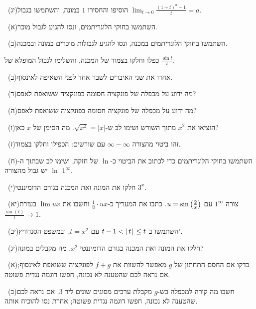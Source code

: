 \documentclass[12pt, a4paper]{article}
\begin{document}
\noindent {}\ (יג)\enskip הוסיפו והחסירו $1$ במונה, והשתמשו בגבול $\lim_{t\to0}\frac{(1+t)^a-1}{t}=a$.\par\smallskip
\noindent {}\ (א)\enskip השתמשו בחוקי הלוגריתמים, ונסו להגיע לגבול מוכר.\par\smallskip
\noindent {}\ (ב)\enskip השתמשו בחוקי הלוגריתמים במכנה, ונסו להגיע לגבולות מוכרים במונה ובמכנה.\par\smallskip
\noindent {}\enskip כפלו וחלקו בצמוד של המכנה, והשלימו לגבול המופלא של $\frac{\sin t}{t}$.\par\smallskip
\noindent {}\ (ב)\enskip אחדו את שני האיברים לשבר אחד לפני השאיפה לאינסוף.\par\smallskip
\noindent {}\ (ד)\enskip מה ידוע על מכפלה של פונקציה חסומה בפונקציה ששואפת לאפס?\par\smallskip
\noindent {}\ (ה)\enskip מה ידוע על מכפלה של פונקציה חסומה בפונקציה ששואפת לאפס?\par\smallskip
\noindent {}\ (ו)\enskip הוציאו את $x^2$ מתוך השורש ושימו לב ש-$\sqrt{x^2}=|x|$. מה הסימן של $x$ כאן?\par\smallskip
\noindent {}\ (ז)\enskip זהו ביטוי מהצורה $\infty-\infty$ עם שורשים: הכפילו וחלקו בצמוד.\par\smallskip
\noindent {}\ (ח)\enskip השתמשו בחוקי הלוגריתמים כדי לכתוב את הביטוי כ-$\ln$ של חזקה, ושימו לב שבתוך ה-$\ln$ יש גבול מהצורה $1^\infty$.\par\smallskip
\noindent {}\ (י)\enskip חלקו את המונה ואת המכנה בגורם הדומיננטי $3^x$.\par\smallskip
\noindent {}\ (יא)\enskip צורה $1^\infty$ עם $u=\sin\left(\frac2x\right)$. כתבו את המעריך כ-$\frac1u\cdot ux$ וחשבו את $\lim ux$ בעזרת $\frac{\sin(t)}{t}\to1$.\par\smallskip
\noindent {}\ (יב)\enskip השתמשו ב-$t-1<\left\lfloor t\right\rfloor\le t$ עם $t=x^2$, ובמשפט הסנדוויץ'.\par\smallskip
\noindent {}\ (יג)\enskip חלקו את המונה ואת המכנה בגורם הדומיננטי $x^2$. מה מקבלים במונה?\par\smallskip
\noindent {}\ (א)\enskip בדקו אם החסם התחתון של $g$ מאפשר להשוות את $f+g$ לפונקציה ששואפת לאינסוף; אם נראה לכם שהטענה לא נכונה, חפשו דוגמה נגדית פשוטה.\par\smallskip
\noindent {}\ (ב)\enskip חשבו מה קורה למכפלה כש-$g$ מקבלת ערכים מסוגים שונים ליד $3$. אם נראה לכם שהטענה לא נכונה, חפשו דוגמה נגדית פשוטה; אחרת נסו להוכיח אותה.\par\smallskip
\end{document}
